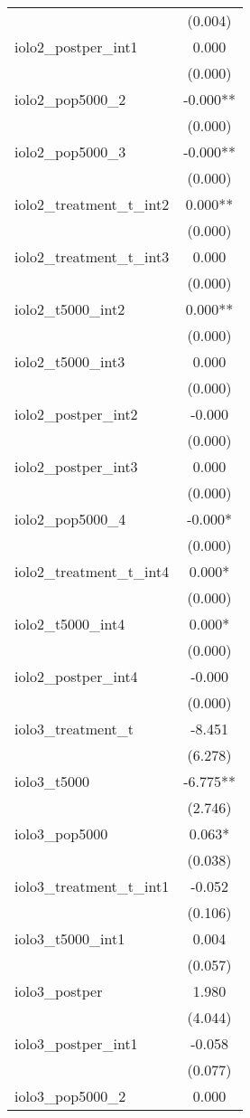 \documentclass[]{article}
\begin{document}
\begin{tabular}{lc}
 & (0.004) \\
iolo2\_postper\_int1 & 0.000 \\
 & (0.000) \\
iolo2\_pop5000\_2 & -0.000** \\
 & (0.000) \\
iolo2\_pop5000\_3 & -0.000** \\
 & (0.000) \\
iolo2\_treatment\_t\_int2 & 0.000** \\
 & (0.000) \\
iolo2\_treatment\_t\_int3 & 0.000 \\
 & (0.000) \\
iolo2\_t5000\_int2 & 0.000** \\
 & (0.000) \\
iolo2\_t5000\_int3 & 0.000 \\
 & (0.000) \\
iolo2\_postper\_int2 & -0.000 \\
 & (0.000) \\
iolo2\_postper\_int3 & 0.000 \\
 & (0.000) \\
iolo2\_pop5000\_4 & -0.000* \\
 & (0.000) \\
iolo2\_treatment\_t\_int4 & 0.000* \\
 & (0.000) \\
iolo2\_t5000\_int4 & 0.000* \\
 & (0.000) \\
iolo2\_postper\_int4 & -0.000 \\
 & (0.000) \\
iolo3\_treatment\_t & -8.451 \\
 & (6.278) \\
iolo3\_t5000 & -6.775** \\
 & (2.746) \\
iolo3\_pop5000 & 0.063* \\
 & (0.038) \\
iolo3\_treatment\_t\_int1 & -0.052 \\
 & (0.106) \\
iolo3\_t5000\_int1 & 0.004 \\
 & (0.057) \\
iolo3\_postper & 1.980 \\
 & (4.044) \\
iolo3\_postper\_int1 & -0.058 \\
 & (0.077) \\
iolo3\_pop5000\_2 & 0.000 \\

\end{tabular}
\end{document}
